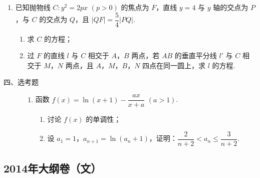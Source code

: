 \begin{description}
\begin{enumerate}[leftmargin=5pt]
        \item 已知抛物线 \(C: y^{2} = 2px\) \(\left(p > 0\right)\) 的焦点为 \(F\)，直线 \(y = 4\) 与 \(y\) 轴的交点为 \(P\)，与 \(C\) 的交点为 \(Q\)，且 \(|QF| = \dfrac{5}{4}|PQ|\).

\begin{enumerate}
\item 求 \(C\) 的方程；
\item 过 \(F\) 的直线 \(l\) 与 \(C\) 相交于 \(A\)，\(B\) 两点，若 \(AB\) 的垂直平分线 \(l'\) 与 \(C\) 相交于 \(M\)，\(N\) 两点，且 \(A\)，\(M\)，\(B\)，\(N\) 四点在同一圆上，求 \(l\) 的方程.
\end{enumerate}

    \end{enumerate}

\end{description}

\begin{description}

    \item[四、选考题]

    \begin{enumerate}[leftmargin=5pt]

      \addtocounter{enumi}{+21}

        \item 函数 \(f(x)=\ln(x+1)-\dfrac{ax}{x+a}\) \(\left(a>1\right)\).

\begin{enumerate}
\item 讨论 \(f(x)\) 的单调性；
\item 设 \(a_{1}=1\)，\(a_{n+1}=\ln(a_{n}+1)\)，证明：\(\dfrac{2}{n+2}<a_{n}\leqslant \dfrac{3}{n+2}\).
\end{enumerate}

    \end{enumerate}

\end{description}


\subsection{2014年大纲卷（文）}\label{gk:2014年大纲卷（文）}

